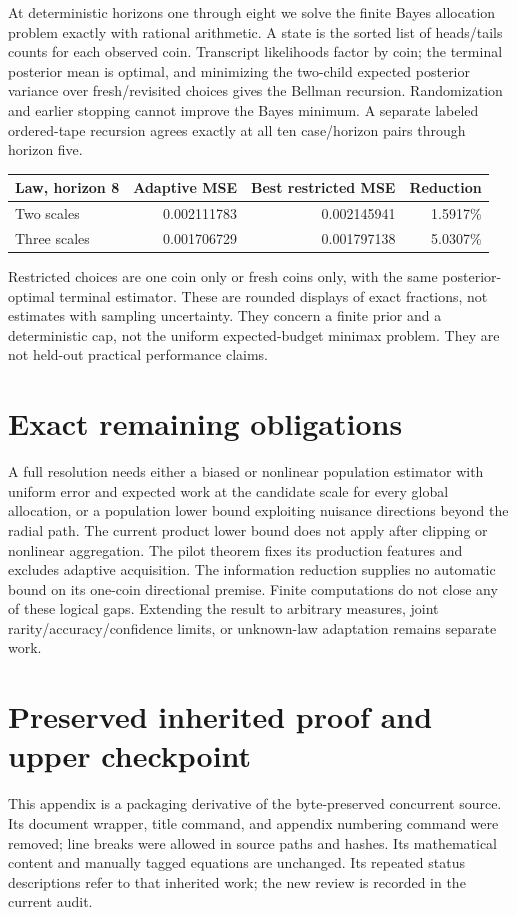\documentclass[11pt]{article}
\begin{document}
At deterministic horizons one through eight we solve the finite Bayes
allocation problem exactly with rational arithmetic. A state is the sorted
list of heads/tails counts for each observed coin. Transcript likelihoods
factor by coin; the terminal posterior mean is optimal, and minimizing
the two-child expected posterior variance over fresh/revisited choices
gives the Bellman recursion. Randomization and earlier stopping cannot
improve the Bayes minimum. A separate labeled ordered-tape recursion agrees
exactly at all ten case/horizon pairs through horizon five.

\begin{center}
\begin{tabular}{lrrr}
Law, horizon 8 & Adaptive MSE & Best restricted MSE & Reduction\\\hline
Two scales & 0.002111783 & 0.002145941 & 1.5917\%\\
Three scales & 0.001706729 & 0.001797138 & 5.0307\%
\end{tabular}
\end{center}
Restricted choices are one coin only or fresh coins only, with the same
posterior-optimal terminal estimator. These are rounded displays of exact
fractions, not estimates with sampling uncertainty. They concern a finite
prior and a deterministic cap, not the uniform expected-budget minimax
problem. They are not held-out practical performance claims.

\section{Exact remaining obligations}
A full resolution needs either a biased or nonlinear population estimator
with uniform error and expected work at the candidate scale for every
global allocation, or a population lower bound exploiting nuisance
directions beyond the radial path. The current product lower bound does
not apply after clipping or nonlinear aggregation. The pilot theorem fixes
its production features and excludes adaptive acquisition. The information
reduction supplies no automatic bound on its one-coin directional premise.
Finite computations do not close any of these logical gaps. Extending
the result to arbitrary measures, joint rarity/accuracy/confidence limits,
or unknown-law adaptation remains separate work.

\appendix
\section{Preserved inherited proof and upper checkpoint}
\noindent This appendix is a packaging derivative of the byte-preserved
concurrent source. Its document wrapper, title command, and appendix
numbering command were removed; line breaks were allowed in source paths
and hashes. Its mathematical content and manually
tagged equations are unchanged. Its repeated status descriptions refer
to that inherited work; the new review is recorded in the current audit.

\end{document}
